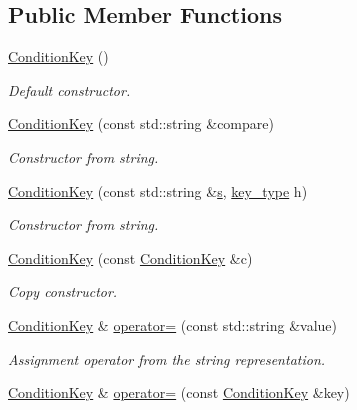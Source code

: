 \subsection*{Public Member Functions}
\begin{DoxyCompactItemize}
\item 
\hyperlink{class_d_d4hep_1_1_conditions_1_1_condition_key_a032d6c5ca16bc201fb7166d686a6207a}{Condition\+Key} ()
\begin{DoxyCompactList}\small\item\em Default constructor. \end{DoxyCompactList}\item 
\hyperlink{class_d_d4hep_1_1_conditions_1_1_condition_key_a3b476d13ac915f5df91eb33b2b95a552}{Condition\+Key} (const std\+::string \&compare)
\begin{DoxyCompactList}\small\item\em Constructor from string. \end{DoxyCompactList}\item 
\hyperlink{class_d_d4hep_1_1_conditions_1_1_condition_key_a18c78ead871dbf313c582dad6e2ae336}{Condition\+Key} (const std\+::string \&\hyperlink{_volumes_8cpp_a17ca6bfc8040d695d3cada22a4763d40}{s}, \hyperlink{class_d_d4hep_1_1_conditions_1_1_condition_key_a08bfc8ccb807bdd5e4d9f3b065d1c8f5}{key\+\_\+type} h)
\begin{DoxyCompactList}\small\item\em Constructor from string. \end{DoxyCompactList}\item 
\hyperlink{class_d_d4hep_1_1_conditions_1_1_condition_key_a66405dd06d894a5f871f8ad8640f1db5}{Condition\+Key} (const \hyperlink{class_d_d4hep_1_1_conditions_1_1_condition_key}{Condition\+Key} \&c)
\begin{DoxyCompactList}\small\item\em Copy constructor. \end{DoxyCompactList}\item 
\hyperlink{class_d_d4hep_1_1_conditions_1_1_condition_key}{Condition\+Key} \& \hyperlink{class_d_d4hep_1_1_conditions_1_1_condition_key_a161b7bb32fa7d86dcd490e964d17f2df}{operator=} (const std\+::string \&value)
\begin{DoxyCompactList}\small\item\em Assignment operator from the string representation. \end{DoxyCompactList}\item 
\hyperlink{class_d_d4hep_1_1_conditions_1_1_condition_key}{Condition\+Key} \& \hyperlink{class_d_d4hep_1_1_conditions_1_1_condition_key_a4b89b384d431b3699986aa21935ddd8b}{operator=} (const \hyperlink{class_d_d4hep_1_1_conditions_1_1_condition_key}{Condition\+Key} \&key)

\end{DoxyCompactItemize}
